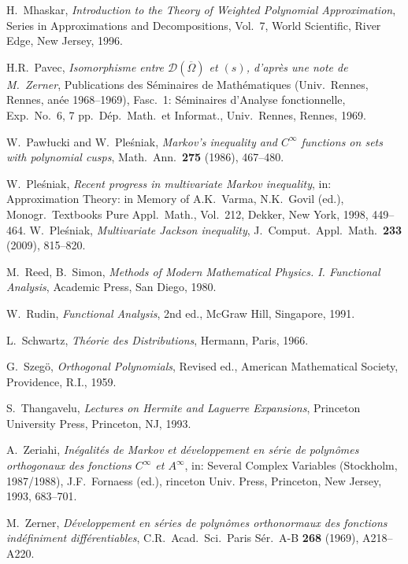 \documentclass[12pt, reqno]{amsart}
\numberwithin{equation}{section}
\theoremstyle{plain}
\theoremstyle{definition}
\begin{document}
\begin{thebibliography}{99}
 H.~Mhaskar, \emph{Introduction to the Theory of Weighted Polynomial Approximation}, Series in Approximations and Decompositions, Vol.\ 7, World Scientific, River Edge, New Jersey, 1996.

 H.R.~Pavec, \emph{Isomorphisme entre $\mathcal{D}(\overline{\Omega})$ et $(s)$, d'apr\`{e}s une note de M.~Zerner}, Publications des S\'{e}minaires de Math\'{e}matiques (Univ.\ Rennes, Rennes, an\'ee 1968--1969), Fasc.~1: S\'eminaires d'Analyse fonctionnelle, Exp.\ No.~6, 7 pp.\ D\'ep.\ Math.\ et Informat., Univ.\ Rennes, Rennes, 1969.

 W.~Paw\l{}ucki and W.~Ple\'{s}niak, \emph{Markov's inequality and $C^\infty$ functions on sets with polynomial cusps}, Math.\ Ann.\ {\bf 275} (1986), 467--480.

 W.~Ple\'{s}niak, \emph{Recent progress in multivariate Markov inequality},  in: Approximation Theory: in Memory of A.K.~Varma, N.K.~Govil (ed.), Monogr.\ Textbooks Pure Appl.\ Math., Vol.\  212, Dekker, New York, 1998, 449--464.
 W.~Ple\'{s}niak, \emph{Multivariate Jackson inequality}, J.\ Comput.\ Appl.\ Math.\  {\bf  233} (2009), 815--820.

 M.~Reed, B.~Simon, \emph{Methods of Modern Mathematical Physics. I. Functional Analysis}, Academic Press, San Diego, 1980.

 W.~Rudin, \emph{Functional Analysis}, 2nd ed.,  McGraw Hill, Singapore, 1991.

 L.~Schwartz, \emph{Th{\'e}orie des Distributions}, Hermann, Paris, 1966.

 G.~Szeg{\"o}, \emph{Orthogonal Polynomials}, Revised ed., American Mathematical Society, Providence, R.I., 1959.

 S.~Thangavelu, \emph{Lectures on Hermite and Laguerre Expansions}, Princeton University Press, Princeton, NJ, 1993.

 A.~Zeriahi, \emph{In\'{e}galit\'{e}s de Markov et d\'{e}veloppement en s\'{e}rie de polyn\^{o}mes orthogonaux des fonctions $C^{\infty}$ et $A^{\infty}$},  in: Several Complex Variables (Stockholm, 1987/1988), J.F.\ Fornaess (ed.), rinceton Univ. Press, Princeton, New Jersey, 1993, 683--701.

 M.~Zerner, \emph{D\'{e}veloppement en s\'{e}ries de polyn\^{o}mes orthonormaux des fonctions ind\'{e}finiment diff\'{e}rentiables},  C.R.\ Acad.\ Sci.\ Paris S\'{e}r.\  A-B {\bf  268} (1969), A218--A220.

\end{thebibliography}
\end{document}
